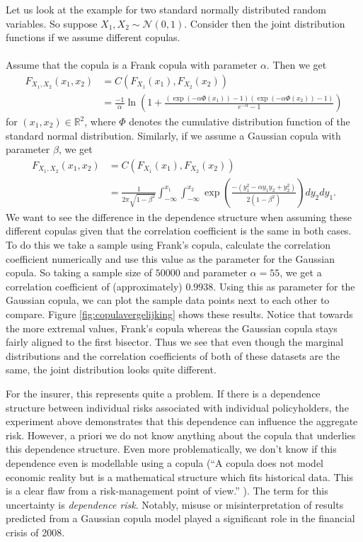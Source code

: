 \documentclass{article}
\begin{document}
Let us look at the example for two standard normally distributed random variables. So suppose $X_1,X_2\sim\mathcal{N}(0, 1)$. Consider then the joint distribution functions if we assume different copulas. \\\\
Assume that the copula is a Frank copula with parameter $\alpha$. Then we get
\begin{align*}
    F_{X_1,X_2}(x_1,x_2) &= C(F_{X_1}(x_1),F_{X_2}(x_2))\\
    &= \frac{-1}{\alpha}\ln\left(1+\frac{\left(\exp\left(-\alpha\Phi (x_1)\right) - 1\right)\left(\exp\left(-\alpha\Phi(x_2)\right) - 1\right)}{e^{-\alpha} - 1}\right)
\end{align*}
for $(x_1,x_2)\in \mathbb{R}^2$, where $\Phi$ denotes the cumulative distribution function of the standard normal distribution.
Similarly, if we assume a Gaussian copula with parameter $\beta$, we get
\begin{align*}
    F_{X_1,X_2}(x_1,x_2) &= C(F_{X_1}(x_1),F_{X_2}(x_2))\\
    &= \frac{1}{2\pi \sqrt{1-\beta^2}}\int_{-\infty}^{x_1}\int_{-\infty}^{x_2}\exp\left(\frac{-(y_1^2 - \alpha y_1 y_2 + y_2^2)}{2(1-\beta^2)}\right)d{y_2}d{y_1}.
\end{align*}
We want to see the difference in the dependence structure when assuming these different copulas given that the correlation coefficient is the same in both cases. To do this we take a sample using Frank's copula, calculate the correlation coefficient numerically and use this value as the parameter for the Gaussian copula. So taking a sample size of $50000$ and parameter $\alpha = 55$, we get a correlation coefficient of (approximately) $0.9938$. Using this as parameter for the Gaussian copula, we can plot the sample data points next to each other to compare. Figure \ref{fig:copulavergelijking} shows these results. Notice that towards the more extremal values, Frank's copula  whereas the Gaussian copula stays fairly aligned to the first bisector. Thus we see that even though the marginal distributions and the correlation coefficients of both of these datasets are the same, the joint distribution looks quite different.

For the insurer, this represents quite a problem. If there is a dependence structure between individual risks associated with individual policyholders, the experiment above demonstrates that this dependence can influence the aggregate risk. However, a priori we do not know anything about the copula that underlies this dependence structure. Even more problematically, we don't know if this dependence even is modellable using a copula (``A copula does not model economic reality but is a mathematical structure which fits historical data. This is a clear flaw from a risk-management point of view.'' \cite{Donnelly_Embrechts_2010}). The term for this uncertainty is \textit{dependence risk}. Notably, misuse or misinterpretation of results predicted from a Gaussian copula model played a significant role in the financial crisis of 2008. 
\end{document}
